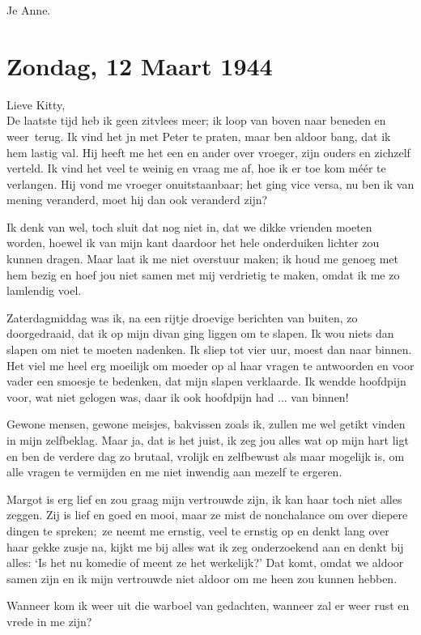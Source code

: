 \documentclass{book}
\begin{document}
Je Anne.

\chapter{Zondag, 12 Maart 1944}

Lieve Kitty,\\De laatste tijd heb ik geen zitvlees meer; ik loop van
boven naar beneden en weer~terug. Ik vind het jn met Peter te praten,
maar ben aldoor bang, dat ik hem lastig val. Hij heeft me het een en
ander over vroeger, zijn ouders en zichzelf verteld. Ik vind het veel te
weinig en vraag me af, hoe ik er toe kom méér te verlangen. Hij vond me
vroeger onuitstaanbaar; het ging vice versa, nu ben ik van mening
veranderd, moet hij dan ook veranderd zijn?

Ik denk van wel, toch sluit dat nog niet in, dat we dikke vrienden
moeten worden, hoewel ik van mijn kant daardoor het hele onderduiken
lichter zou kunnen dragen. Maar laat ik me niet overstuur maken; ik houd
me genoeg met hem bezig en hoef jou niet samen met mij verdrietig te
maken, omdat ik me zo lamlendig voel.

Zaterdagmiddag was ik, na een rijtje droevige berichten van buiten, zo
doorgedraaid, dat ik op mijn divan ging liggen om te slapen. Ik wou
niets dan slapen om niet te moeten nadenken. Ik sliep tot vier uur,
moest dan naar binnen. Het viel me heel erg moeilijk om moeder op al
haar vragen te antwoorden en voor vader een smoesje te bedenken, dat
mijn slapen verklaarde. Ik wendde hoofdpijn voor, wat niet gelogen was,
daar ik ook hoofdpijn had ... van binnen!

Gewone mensen, gewone meisjes, bakvissen zoals ik, zullen me wel getikt
vinden in mijn zelfbeklag. Maar ja, dat is het juist, ik zeg jou alles
wat op mijn hart ligt en ben de verdere dag zo brutaal, vrolijk en
zelfbewust als maar mogelijk is, om alle vragen te vermijden en me niet
inwendig aan mezelf te ergeren.

Margot is erg lief en zou graag mijn vertrouwde zijn, ik kan haar toch
niet alles zeggen. Zij is lief en goed en mooi, maar ze mist de
nonchalance om over diepere dingen te spreken;~ze neemt me ernstig, veel
te ernstig op en denkt lang over haar gekke zusje na, kijkt me bij alles
wat ik zeg onderzoekend aan en denkt bij alles: `Is het nu komedie of
meent ze het werkelijk?' Dat komt, omdat we aldoor samen zijn en ik mijn
vertrouwde niet aldoor om me heen zou kunnen hebben.

Wanneer kom ik weer uit die warboel van gedachten, wanneer zal er weer
rust en vrede in me zijn?
\end{document}
